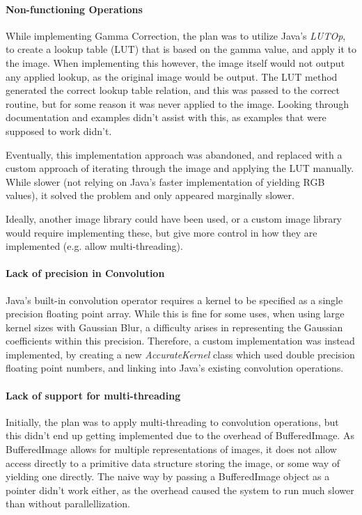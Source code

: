 \documentclass[10pt,a4paper]{article}
\begin{document}
\paragraph{Non-functioning Operations}
While implementing Gamma Correction, the plan was to utilize Java's \emph{LUTOp}, to create a lookup table (LUT) that is based on the gamma value,
and apply it to the image. When implementing this however, the image itself would not output any applied lookup, as the original image would be output.
The LUT method generated the correct lookup table relation, and this was passed to the correct routine, but for some reason it was never applied to the image. Looking through
documentation and examples didn't assist with this, as examples that were supposed to work didn't.

Eventually, this implementation approach was abandoned, and replaced with a custom approach of iterating through the image and applying the LUT
manually. While slower (not relying on Java's faster implementation of yielding RGB values), it solved the problem and only appeared marginally slower.

Ideally, another image library could have been used, or a custom image library would require implementing these, but give more control in how they are implemented
(e.g. allow multi-threading).
\paragraph{Lack of precision in Convolution}
Java's built-in convolution operator requires a kernel to be specified as a single precision floating point array. While this is fine for some
uses, when using large kernel sizes with Gaussian Blur, a difficulty arises in representing the Gaussian coefficients within this precision. Therefore,
a custom implementation was instead implemented, by creating a new \emph{AccurateKernel} class which used double precision floating point numbers, and
linking into Java's existing convolution operations.

\paragraph{Lack of support for multi-threading}
Initially, the plan was to apply multi-threading to convolution operations, but this didn't end up getting implemented due to the overhead of BufferedImage.
As BufferedImage allows for multiple representations of images, it does not allow access directly to a primitive data structure storing the image, or some way of
yielding one directly. The naive way by passing a BufferedImage object as a pointer didn't work either, as the overhead caused the system to run much slower than without parallellization.
\end{document}
